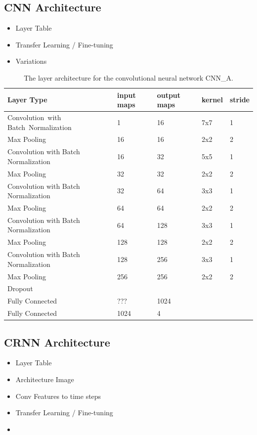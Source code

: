 \subsection{CNN Architecture}


    \begin{itemize}
        \item Layer Table
        \item Transfer Learning / Fine-tuning
        \item Variations
    \end{itemize}
    
    \begin{table}[h]
  \centering
  \begin{tabularx}{\textwidth}{Xllll}
  \toprule
  Layer Type                       & input maps  & output maps & kernel & stride  \\ \midrule
  \mbox{Convolution with} \mbox{Batch Normalization}  & 1           & 16     & 7x7    & 1       \\ 
  Max Pooling                           & 16          & 16     & 2x2    & 2       \\ 
  Convolution with Batch Normalization  & 16          & 32     & 5x5    & 1       \\ 
  Max Pooling                           & 32          & 32     & 2x2    & 2       \\ 
  Convolution with Batch Normalization  & 32          & 64     & 3x3    & 1       \\ 
  Max Pooling                           & 64          & 64     & 2x2    & 2       \\ 
  Convolution with Batch Normalization  & 64          & 128    & 3x3    & 1       \\ 
  Max Pooling                           & 128         & 128    & 2x2    & 2       \\ 
  Convolution with Batch Normalization  & 128         & 256    & 3x3    & 1       \\ 
  Max Pooling                           & 256         & 256    & 2x2    & 2       \\ 
  Dropout                               &             &        &        &         \\ 
  Fully Connected                       & ???         & 1024   &        &         \\ 
  Fully Connected                       & 1024        & 4      &        &        \\ 
  \bottomrule
  \end{tabularx}
  \caption{The layer architecture for the convolutional neural network CNN\_A.}
  \label{tab:layers_CNN_A}
  \end{table}
    
    

\subsection{CRNN Architecture}

    \begin{itemize}
        \item Layer Table
        \item Architecture Image
        \item Conv Features to time steps
        \item Transfer Learning / Fine-tuning
        \item 
    \end{itemize}
